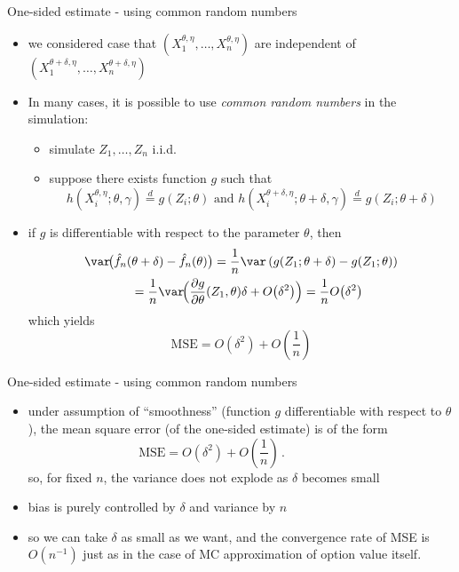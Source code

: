 \documentclass[pdf, handout]{beamer}
\begin{document}
\begin{frame}{One-sided estimate - using common random numbers}
\begin{itemize}
\item we considered case that $(X_1^{\theta,\eta},\dots,X_n^{\theta,\eta})$ are independent of
$(X_1^{\theta+\delta,\eta},\dots,X_n^{\theta+\delta,\eta})$
\item In many cases, it is possible to use \emph{common random numbers} in the simulation:
\begin{itemize}
\item simulate $Z_1,\dots,Z_n$ i.i.d.
\item suppose there exists function $g$ such that
\[
h(X_i^{\theta,\eta};\theta,\gamma)
\stackrel{d}{=} g(Z_i;\theta) \text{ and }
h(X_i^{\theta+\delta,\eta};\theta+\delta,\gamma)\stackrel{d}{=} g(Z_i;\theta+\delta)
\]
\end{itemize}
\item if $g$ is differentiable with respect to the parameter $\theta$,
then
\begin{align*}
\var\!\big(
\hat f_n(\theta+\delta) -  \hat f_n(\theta)
\big)= \frac{1}{n}\var\left(
g(Z_1;\theta+\delta) - g(Z_1;\theta)
\right)
 \\
= \frac{1}{n}  \var\!\Big( \frac{\partial g}{\partial \theta} (Z_1,\theta)\delta + O\big(\delta^2\big)\Big)
= \frac{1}{n}O\big(\delta^2\big) \hspace{1cm}
\end{align*}
which yields
\[
\text{MSE} = O( \delta^2 ) + O(  \frac{1}{n})
\]
\end{itemize}
\end{frame}

\begin{frame}{One-sided estimate - using common random numbers}
\begin{itemize}
\item under  assumption of ``smoothness''
(function $g$ differentiable with respect to $\theta$), the mean square error (of the one-sided estimate)
is of the form
$$
\text{MSE} = O( \delta^2) + O\left(\frac{1}{n}\right)\,. \hspace{2cm}
$$
so, for fixed $n$, the variance does not explode as $\delta$ becomes small
\item
bias is purely controlled by $\delta$ and variance by $n$
\item so we can take
$\delta$ as small as we want, and the convergence
rate of MSE is $O(n^{-1})$ just as in the case of MC approximation of option value itself.
\end{itemize}
\end{frame}
\end{document}
